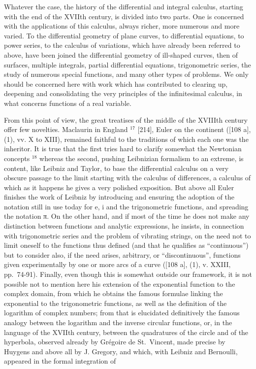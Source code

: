 Whatever the case, the history of the differential and integral calculus, starting with the end of the XVIIth century, is divided into two parts. One is concerned with the applications of this calculus, always richer, more numerous and more varied. To the differential geometry of plane curves, to differential equations, to power series, to the calculus of variations, which have already been referred to above, have been joined the differential geometry of ill-shaped curves, then of surfaces, multiple integrals, partial differential equations, trigonometric series, the study of numerous special functions, and many other types of problems. We only should be concerned here with work which has contributed to clearing up, deepening and consolidating the very principles of the infinitesimal calculus, in what concerns functions of a real variable.

From this point of view, the great treatises of the middle of the XVIIIth century offer few novelties. Maclaurin in England \(^{17}\) {[}214{]}, Euler on the continent ({[}108 a{]}, (1), vv. X to XIII), remained faithful to the traditions of which each one was the inheritor. It is true that the first tries hard to clarify somewhat the Newtonian concepts \(^{18}\) whereas the second, pushing Leibnizian formalism to an extreme, is content, like Leibniz and Taylor, to base the differential calculus on a very obscure passage to the limit starting with the calculus of differences, a calculus of which as it happens he gives a very polished exposition. But above all Euler finishes the work of Leibniz by introducing and ensuring the adoption of the notation still in use today for e, i and the trigonometric functions, and spreading the notation π. On the other hand, and if most of the time he does not make any distinction between functions and analytic expressions, he insists, in connection with trigonometric series and the problem of vibrating strings, on the need not to limit oneself to the functions thus defined (and that he qualifies as ``continuous'') but to consider also, if the need arises, arbitrary, or ``discontinuous'', functions given experimentally by one or more arcs of a curve ({[}108 a{]}, (1), v. XXIII, pp.~74-91). Finally, even though this is somewhat outside our framework, it is not possible not to mention here his extension of the exponential function to the complex domain, from which he obtains the famous formulae linking the exponential to the trigonometric functions, as well as the definition of the logarithm of complex numbers; from that is elucidated definitively the famous analogy between the logarithm and the inverse circular functions, or, in the language of the XVIIth century, between the quadratures of the circle and of the hyperbola, observed already by Grégoire de St.~Vincent, made precise by Huygens and above all by J. Gregory, and which, with Leibniz and Bernoulli, appeared in the formal integration of

